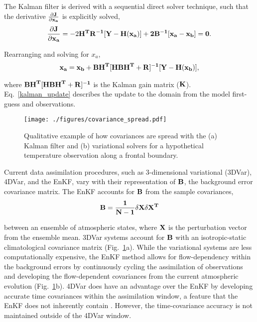 \documentclass{ttuthes2007}
\newcommand{\tab}{\hspace*{2em}}  %
\begin{document}
\tab The Kalman filter \citep{Kalman1960} is derived with a sequential direct solver technique, such that the derivative $\frac{\partial \bf{J}}{\partial \bf{x_a}}$ is explicitly solved,
\begin{align}\label{djdx}
	\frac{\partial \bf{J}}{\partial \bf{x_a}} = -2\bf{H}^T\bf{R}^{-1} [\bf{Y}-H(\bf{x_a})] + 2\bf{B}^{-1} [\bf{x_a} - \bf{x_b}] = 0.
\end{align}

Rearranging and solving for $x_a$,
\begin{align}\label{kalman_update}
	\bf{x_a} = \bf{x_b} + \bf{BH}^T [\bf{HBH}^T + \bf{R}]^{-1} [\bf{Y}-\bf{H}(\bf{x_b})],
\end{align}

where $\bf{BH}^T  [ \bf{HBH}^T+\bf{R} ]^{-1}$ is the Kalman gain matrix ($\bf{K}$). Eq.~\ref{kalman_update} describes the update to the domain from the model first-guess and observations. \\

\begin{figure}[t]
  \centering
  \noindent\texttt{[image: ./figures/covariance\_spread.pdf]}\\
  \caption{Qualitative example of how covariances are spread with the (a) Kalman filter and (b) variational solvers for a hypothetical temperature observation along a frontal boundary.}
\label{covariance_spread}
\end{figure}

\tab Current data assimilation procedures, such as 3-dimensional variational (3DVar), 4DVar, and the EnKF, vary with their representation of $\bf{B}$, the background error covariance matrix. The EnKF accounts for $\bf{B}$ from the sample covariances, 
\begin{align}\label{background_covar}
	\bf{B} = \frac{1}{N-1} \delta \bf{X} \delta \bf{X}^T
\end{align}

between an ensemble of atmospheric states, where $\bf{X} $ is the perturbation vector from the ensemble mean. 3DVar systems account for $\bf{B}$ with an isotropic-static climatological covariance matrix (Fig.~\ref{covariance_spread}a). While the variational systems are less computationally expensive, the EnKF method allows for flow-dependency within the background errors by continuously cycling the assimilation of observations and developing the flow-dependent covariances from the current atmospheric evolution (Fig.~\ref{covariance_spread}b). 4DVar does have an advantage over the EnKF by developing accurate time covariances within the assimilation window, a feature that the EnKF does not inherently contain \citep{Kalnayetal2007}. However, the time-covariance accuracy is not maintained outside of the 4DVar window. 
\end{document}
